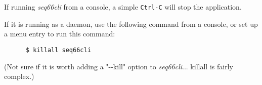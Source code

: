    If running \textsl{seq66cli} from a console, a simple
   \texttt{Ctrl-C} will stop the application.

   If it is running as a daemon, use the following command from a console,
   or set up a menu entry to run this command:

   \begin{verbatim}
      $ killall seq66cli
   \end{verbatim}

   (Not sure if it is worth adding a "-{}-kill" option to
   \textsl{seq66cli}... killall is fairly complex.)

